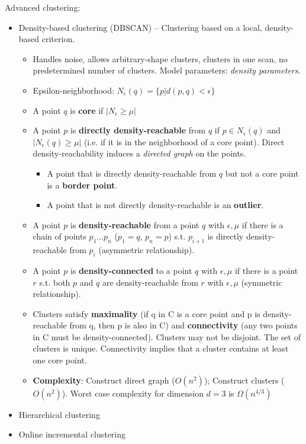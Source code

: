     Advanced clustering:
    \begin{itemize}
    	\item Density-based clustering (DBSCAN) -- Clustering based on a local, density-based criterion.
    	\begin{itemize}
    		\item Handles noise, allows arbitrary-shape clusters, clusters in one scan, no predetermined number of clusters. Model parameters: \emph{density parameters}.
    		\item Epsilon-neighborhood: $N_\epsilon (q) = \{p|d(p,q)<\epsilon \}$
    		\item A point $q$ is \textbf{core} if $|N_\epsilon \geq \mu|$
    		\item A point $p$ is \textbf{directly density-reachable} from $q$ if $p\in N_\epsilon(q)$ and $|N_\epsilon(q)\geq \mu|$ (i.e. if it is in the neighborhood of a core point). Direct density-reachability induces a \emph{directed graph} on the points.
    		\begin{itemize}
    			\item A point that is directly density-reachable from $q$ but not a core point is a \textbf{border point}.
    			\item A point that is not directly density-reachable is an \textbf{outlier}.
    		\end{itemize}
    		\item A point $p$ is \textbf{density-reachable} from a point $q$ with $\epsilon,\mu$ if there is a chain of points $p_1...p_n$ ($p_1=q$, $p_n=p$) s.t. $p_{i+1}$ is directly density-reachable from $p_i$ (asymmetric relationship).
    		\item A point $p$ is \textbf{density-connected} to a point $q$ with $\epsilon,\mu$ if there is a point $r$ s.t. both $p$ and $q$ are density-reachable from $r$ with $\epsilon,\mu$ (symmetric relationship).
    		\item Clusters satisfy \textbf{maximality} (if q in C is a core point and p is density-reachable from q, then p is also in C) and \textbf{connectivity} (any two points in C must be density-connected). Clusters may not be disjoint. The set of clusters is unique. Connectivity implies that a cluster contains at least one core point.
    		\item \textbf{Complexity}: Construct direct graph ($O(n^2)$); Construct clusters ($O(n^2)$). Worst case complexity for dimension $d=3$ is $\Omega(n^{4/3})$
    	\end{itemize}
    	\item Hierarchical clustering
    	\item Online incremental clustering
    \end{itemize}

